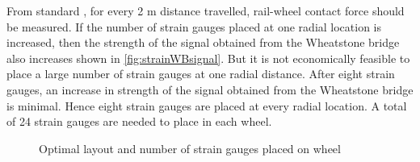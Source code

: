 \documentclass[]{interact}
\theoremstyle{plain}%
\theoremstyle{definition}
\theoremstyle{remark}
\begin{document}
From standard \cite{UIC, EN}, for every 2 m distance travelled, rail-wheel contact force should be measured.  If the number of strain gauges placed at one radial location is increased, then the strength of the signal obtained from the Wheatstone bridge also increases shown in \cref{fig:strainWBsignal}. But it is not economically feasible to place a large number of strain gauges at one radial distance. After eight strain gauges, an increase in strength of the signal obtained from the Wheatstone bridge is minimal. Hence eight strain gauges are placed at every radial location. A total of 24 strain gauges are needed to place in each wheel.


\begin{figure}[h]
\centering



\caption{Optimal layout and number of strain gauges placed on wheel} \label{fig:Wheatstonebridge}
\end{figure}
\end{document}
